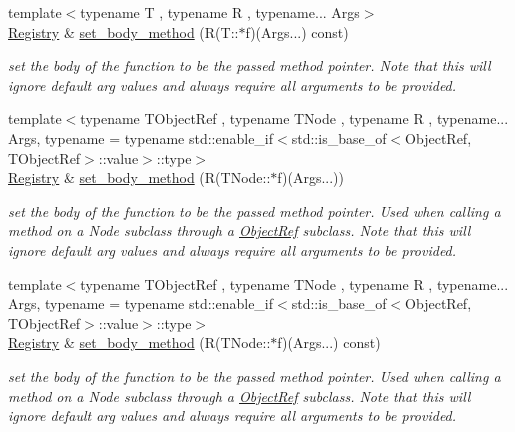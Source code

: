 \begin{DoxyCompactItemize}
{\footnotesize template$<$typename T , typename R , typename... Args$>$ }\\\hyperlink{classtvm_1_1runtime_1_1Registry}{Registry} \& \hyperlink{classtvm_1_1runtime_1_1Registry_ae1243626f5f81ca956343dbe8c22b9b3}{set\+\_\+body\+\_\+method} (R(T\+::$\ast$f)(Args...) const)
\begin{DoxyCompactList}\small\item\em set the body of the function to be the passed method pointer. Note that this will ignore default arg values and always require all arguments to be provided. \end{DoxyCompactList}\item 
{\footnotesize template$<$typename T\+Object\+Ref , typename T\+Node , typename R , typename... Args, typename  = typename std\+::enable\+\_\+if$<$std\+::is\+\_\+base\+\_\+of$<$\+Object\+Ref, T\+Object\+Ref$>$\+::value$>$\+::type$>$ }\\\hyperlink{classtvm_1_1runtime_1_1Registry}{Registry} \& \hyperlink{classtvm_1_1runtime_1_1Registry_ae5fcbc18ff9a33ad700592dc8e46bd90}{set\+\_\+body\+\_\+method} (R(T\+Node\+::$\ast$f)(Args...))
\begin{DoxyCompactList}\small\item\em set the body of the function to be the passed method pointer. Used when calling a method on a Node subclass through a \hyperlink{classtvm_1_1runtime_1_1ObjectRef}{Object\+Ref} subclass. Note that this will ignore default arg values and always require all arguments to be provided. \end{DoxyCompactList}\item 
{\footnotesize template$<$typename T\+Object\+Ref , typename T\+Node , typename R , typename... Args, typename  = typename std\+::enable\+\_\+if$<$std\+::is\+\_\+base\+\_\+of$<$\+Object\+Ref, T\+Object\+Ref$>$\+::value$>$\+::type$>$ }\\\hyperlink{classtvm_1_1runtime_1_1Registry}{Registry} \& \hyperlink{classtvm_1_1runtime_1_1Registry_a106607f2535dc7c838646aabd029aa60}{set\+\_\+body\+\_\+method} (R(T\+Node\+::$\ast$f)(Args...) const)
\begin{DoxyCompactList}\small\item\em set the body of the function to be the passed method pointer. Used when calling a method on a Node subclass through a \hyperlink{classtvm_1_1runtime_1_1ObjectRef}{Object\+Ref} subclass. Note that this will ignore default arg values and always require all arguments to be provided. \end{DoxyCompactList}\end{DoxyCompactItemize}
